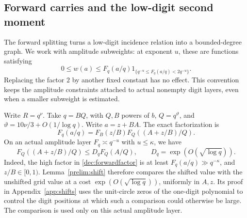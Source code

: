 \documentclass[11pt,a4paper]{article}
\theoremstyle{paperplain}
\numberwithin{equation}{section}
\begin{document}
\subsection{Forward carries and the low-digit second moment}
\label{dec:forward}

The forward splitting turns a low-digit incidence relation into a
bounded-degree graph. We work with amplitude subweights: at exponent $u$,
these are functions satisfying
\[
 0\le w(a)\le F_q(a/q)
       1_{\{q^{-u}\le F_q(a/q)<2q^{-u}\}}.
\]
Replacing the factor $2$ by another fixed constant has no effect.
This convention keeps the amplitude constraints attached to actual
nonempty digit layers, even when a smaller subweight is estimated.

Write $R=q^\nu$. Take $q=BQ$, with $Q,B$ powers of $b$,
$Q=q^{\vartheta}$, and $\vartheta=10\nu/3+O(1/\log q)$.
Write $a=z+BA$.
The exact factorization is
\begin{equation}\label{dec:forwardfactor}
 F_q(a/q)=F_B(z/B)F_Q((A+z/B)/Q).
\end{equation}
On an actual amplitude layer $F_q\asymp q^{-u}$ with $u\le\kappa$,
we have
\begin{equation}\label{dec:shift}
 F_Q((A+z/B)/Q)\le D_qF_Q(A/Q),\qquad
 D_q=\exp(O(\sqrt{\log q})).
\end{equation}
Indeed, the high factor in \eqref{dec:forwardfactor} is at least
$F_q(a/q)\gg q^{-\kappa}$, and $z/B\in[0,1)$.
Lemma~\ref{prelim:shift} therefore compares the shifted value with
the unshifted grid value at a cost $\exp(O(\sqrt{\log q}))$,
uniformly in $A,z$. Its proof in Appendix~\ref{app:shifts} uses the
unit-circle zeros of the one-digit polynomial to control the digit
positions at which such a comparison could otherwise be large. The comparison is used only on
this actual amplitude layer.
\end{document}
